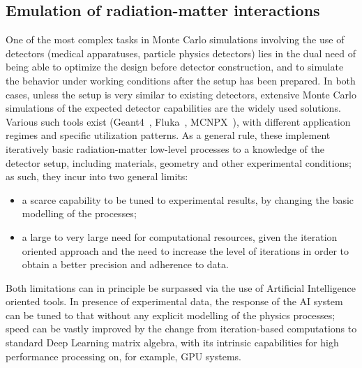 \subsection{Emulation of radiation-matter interactions}
\label{subsec:interactions}
One of the most complex tasks in Monte Carlo simulations involving the use of detectors (medical apparatuses, particle physics detectors) lies in the dual need of being able to optimize the design before detector construction, and to simulate the behavior under working conditions after the setup has been prepared.
In both cases, unless the setup is very similar to existing detectors, extensive Monte Carlo simulations of the expected detector capabilities are the widely used solutions. Various such tools exist (Geant4~\cite{Agostinelli2003}, Fluka~\cite{Bohlen2014}, MCNPX~\cite{Hughes2001}), with different application regimes and specific utilization patterns. As a general rule, these implement iteratively basic radiation-matter low-level processes to a knowledge of the detector setup, including materials, geometry and  other experimental conditions; as such, they incur into two general limits:
\begin{itemize}
\item a scarce capability to be tuned to experimental results, by changing the basic modelling of the processes;
\item a large to very large need for computational resources, given the iteration oriented approach and the need to increase the level of iterations in order to obtain a better precision and adherence to data.
\end{itemize}


Both limitations can in principle be surpassed via the use of Artificial Intelligence oriented tools.
In presence of experimental data, the response of the AI system can be tuned to that without any explicit modelling of the physics processes; speed can be vastly improved by the change from iteration-based computations to standard Deep Learning matrix algebra, with its intrinsic capabilities for high performance processing on, for example, GPU systems.

